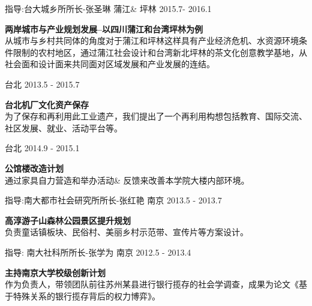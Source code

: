 \begin{cventries}
  \cventry   
    {指导:台大城乡所所长-张圣琳}
    {}
    {蒲江\& 坪林}
    {2015.7- 2016.1}    
    {
      \begin{cvitems}
      	\item{\textbf{两岸城市与产业规划发展--以四川蒲江和台湾坪林为例}\\ 
        从城市与乡村共同体的角度对于蒲江和坪林这样具有产业经济危机、水资源环境条件限制的农村地区，通过蒲江社会设计和台湾新北坪林的茶文化创意教学基地，从社会面和设计面来共同面对区域发展和产业发展的连结。
        }
      \end{cvitems}
      }
      
  \cventry   
    {}
    {}
    {台北}
    {2013.5 - 2015.7}    
    {
      \begin{cvitems}
        \item{ \textbf{台北机厂文化资产保存} \\
        为了保存和再利用此工业遗产，我们提出了一个再利用构想包括教育、国际交流、社区发展、就业、活动平台等。}
      \end{cvitems}
    }
    
    \cventry   
    {}
    {}
    {台北}
    {2014.9 - 2015.1}    
    {
      \begin{cvitems}
        \item{\textbf{公馆楼改造计划 }\\
        通过家具自力营造和举办活动\& 反馈来改善本学院大楼内部环境。
        }
      \end{cvitems}
    }  
    
    \cventry   
    {指导:南大都市社会研究所所长-张红艳}
    {}
    {南京}
    {2013.5 - 2013.7}    
    {
      \begin{cvitems}
        \item{\textbf{高淳游子山森林公园景区提升规划}\\
         负责童话镇板块、民俗村、美丽乡村示范带、宣传片等方案设计。
        }
      \end{cvitems}
    }
    
    
    
   \cventry   
    {指导: 南大社科所所长-张学为}
    {}
    {南京}
    {2012.5 - 2013.4}    
    {
      \begin{cvitems}
        \item{\textbf{主持南京大学校级创新计划}\\ %
        作为负责人，带领团队前往苏州某县进行银行揽存的社会学调查，成果为论文《基于特殊关系的银行揽存背后的权力博弈》。
        }
      \end{cvitems}
    }

\end{cventries}


